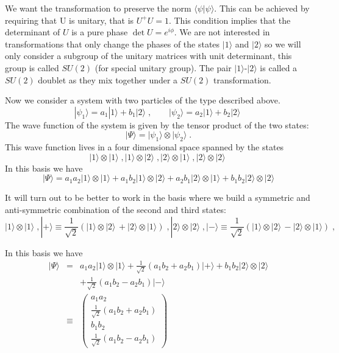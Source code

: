 \documentclass[12pt]{article}
\begin{document}
      We want the transformation to preserve the norm $\langle \psi|\psi\rangle$. This can be achieved by requiring that U is unitary, that is $U^+U=1$. This condition implies that the determinant of $U$ is a pure phase $\det U=e^{i\phi}$. We are not interested in transformations that only change the phases of the states $|1\rangle$ and $|2\rangle$ so we will only consider a subgroup of the unitary matrices with unit determinant, this group is called $SU(2)$ (for special unitary group). The pair $|1\rangle$-$|2\rangle$ is called a $SU(2)$ doublet as they mix together under a $SU(2)$ transformation.
      
      Now we consider a system with two particles of the type described above.
      \[|\psi_1\rangle=a_1|1\rangle+b_1|2 \rangle\;,\qquad
      |\psi_2\rangle=a_2|1\rangle+b_2|2 \rangle\;      \]
      The wave function of the system is given by the tensor product of the two states:
      \[|\Psi\rangle =|\psi_1\rangle \otimes |\psi_2\rangle\;.\]
      This wave function lives in a four dimensional space spanned by the states
      \[|1\rangle \otimes |1\rangle\;,
      |1\rangle \otimes |2\rangle\;,
      |2\rangle \otimes |1\rangle\;,
      |2\rangle \otimes |2\rangle\;      \]
      In this basis we have
      \[|\Psi\rangle=a_1a_2 |1\rangle \otimes |1\rangle + a_1b_2 |1\rangle \otimes |2\rangle +a_2 b_1  |2\rangle \otimes |1\rangle +b_1b_2 |2\rangle \otimes |2\rangle  \]

      It will turn out to be better to work in the basis where we build a symmetric and anti-symmetric combination of the second and third states:
      \[|1\rangle \otimes |1\rangle\;,
      |+\rangle\equiv\frac{1}{\sqrt2}\left( |1\rangle \otimes |2\rangle\,+ |2\rangle \otimes |1\rangle\right)\;,
      |2\rangle \otimes |2\rangle\;,
            |-\rangle\equiv\frac{1}{\sqrt2}\left( |1\rangle \otimes |2\rangle\,- |2\rangle \otimes |1\rangle\right)\;,\]

      In this basis we have
      \begin{eqnarray}
        |\Psi\rangle&=&a_1a_2 |1\rangle \otimes |1\rangle +\frac{1}{\sqrt2}( a_1b_2+a_2b_1) |+\rangle +b_1b_2 |2\rangle \otimes |2\rangle \\&&+\frac{1}{\sqrt2}(a_1 b_2-a_2b_1 ) |-\rangle \\
        &\equiv&\left(\begin{array}{c}a_1a_2\\\frac{1}{\sqrt2}(a_1b_2+a_2b_1)\\b_1b_2\\\frac{1}{\sqrt2}(a_1b_2-a_2b_1)\end{array}\right)
\end{eqnarray}
      
\end{document}
